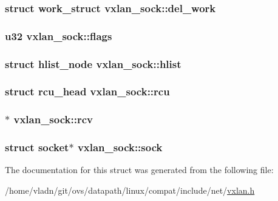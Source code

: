\subsubsection[{del\+\_\+work}]{\setlength{\rightskip}{0pt plus 5cm}struct work\+\_\+struct vxlan\+\_\+sock\+::del\+\_\+work}\label{structvxlan__sock_a951b7a9ee28672b49838176513bf343d}
\hypertarget{structvxlan__sock_ac3711b8cc4c992e3270dee5791a542cf}{}
\subsubsection[{flags}]{\setlength{\rightskip}{0pt plus 5cm}u32 vxlan\+\_\+sock\+::flags}\label{structvxlan__sock_ac3711b8cc4c992e3270dee5791a542cf}
\hypertarget{structvxlan__sock_aa49d034f0fff69c29cb3313b17caea80}{}
\subsubsection[{hlist}]{\setlength{\rightskip}{0pt plus 5cm}struct hlist\+\_\+node vxlan\+\_\+sock\+::hlist}\label{structvxlan__sock_aa49d034f0fff69c29cb3313b17caea80}
\hypertarget{structvxlan__sock_a3ab897e7f7d97d2f2bf71791f5ebffdb}{}
\subsubsection[{rcu}]{\setlength{\rightskip}{0pt plus 5cm}struct rcu\+\_\+head vxlan\+\_\+sock\+::rcu}\label{structvxlan__sock_a3ab897e7f7d97d2f2bf71791f5ebffdb}
\hypertarget{structvxlan__sock_a62dbbfc22620a8120799bad80e04c639}{}
\subsubsection[{rcv}]{$\ast$ vxlan\+\_\+sock\+::rcv}\label{structvxlan__sock_a62dbbfc22620a8120799bad80e04c639}
\hypertarget{structvxlan__sock_a75f35ac3f5f8e0340b2bdc247a84c322}{}
\subsubsection[{sock}]{\setlength{\rightskip}{0pt plus 5cm}struct socket$\ast$ vxlan\+\_\+sock\+::sock}\label{structvxlan__sock_a75f35ac3f5f8e0340b2bdc247a84c322}


The documentation for this struct was generated from the following file\+:\begin{DoxyCompactItemize}
\item 
/home/vladn/git/ovs/datapath/linux/compat/include/net/\hyperlink{vxlan_8h}{vxlan.\+h}\end{DoxyCompactItemize}
